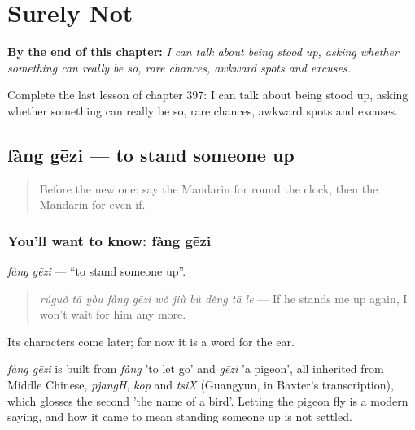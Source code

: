 
\chapter{Surely Not}
\label{ch:zh-surely-not}

\begin{chapteropening}
\textbf{By the end of this chapter:} \emph{I can talk about being stood up, asking whether something can really be so, rare chances, awkward spots and excuses.}

Complete the last lesson of chapter 397: I can talk about being stood up, asking whether something can really be so, rare chances, awkward spots and excuses.
\end{chapteropening}

\section[fàng gēzi]{fàng gēzi — to stand someone up}

\label{lesson:ZH-C397-fanggezi}



\begin{quote}
Before the new one: say the Mandarin for round the clock, then the Mandarin for even if.
\end{quote}

\subsection*{You'll want to know: fàng gēzi}
\emph{fàng gēzi} — \textquotedblleft{}to stand someone up\textquotedblright{}.

\begin{quote}
\emph{rúguǒ tā yòu fàng gēzi wǒ jiù bù děng tā le} — If he stands me up again, I won't wait for him any more.
\end{quote}

Its characters come later; for now it is a word for the ear.

\begin{cousinweb}
\emph{fàng gēzi} is built from \emph{fàng} 'to let go' and \emph{gēzi} 'a pigeon', all inherited from Middle Chinese, \emph{pjangH}, \emph{kop} and \emph{tsiX} (Guangyun, in Baxter's transcription), which glosses the second 'the name of a bird'. Letting the pigeon fly is a modern saying, and how it came to mean standing someone up is not settled.
\end{cousinweb}

